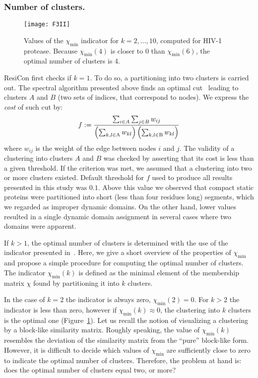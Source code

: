 \documentclass[a4paper,11pt,twoside]{book}%
\begin{document}
\subsubsection*{Number of clusters.}
\begin{figure}
\centering
\texttt{[image: F3II]}
\caption{
Values of the $\chi_{\text{min}}$ indicator for $k=2,\ldots,10$, computed for HIV-1 protease.
Because $\chi_{\text{min}}(4)$ is closer to 0 than $\chi_{\text{min}}(6)$, the optimal number of clusters is 4.
}
\label{minChiList}
\end{figure}
ResiCon first checks if $k=1$.
To do so, a partitioning into two clusters is carried out.
The spectral algorithm presented above finds an optimal cut~\cite{weber2004perron} leading to clusters $A$ and $B$ (two sets of indices, that correspond to nodes).
We express the \emph{cost} of such cut by:
\begin{displaymath}
f :=  \frac{\sum_{i \in A}\sum_{j \in B} w_{ij}}{\left ( \sum_{k,l \in \text{A}} w_{kl} \right ) \left ( \sum_{k,l \in \text{B}} w_{kl}   \right )} \\
\end{displaymath}
where $w_{ij}$ is the weight of the edge between nodes $i$ and $j$.
The validity of a clustering into clusters $A$ and $B$ was checked by asserting that its cost is less than a given threshold.
If the criterion was met, we assumed that a clustering into two or more clusters existed.
Default threshold for $f$ used to produce all results presented in this study was $0.1$. 
Above this value we observed that compact static proteins were partitioned into short (less than four residues long) segments, which we regarded as improper dynamic domains.
On the other hand, lower values resulted in a single dynamic domain assignment in several cases where two domains were apparent.

If $k>1$, the optimal number of clusters is determined with the use of the indicator presented in~\cite{weber2004perron}.
Here, we give a short overview of the properties of $\chi_{\text{min}}$ and propose a simple procedure for computing the optimal number of clusters.
The indicator $\chi_{\text{min}}(k)$ is defined as the minimal element of the membership matrix $\chi$ found by partitioning it into $k$ clusters.

In the case of $k=2$ the indicator is always zero, $\chi_\text{min}(2)=0$.
For $k>2$ the indicator is less than zero, however if $\chi_\text{min}(k)\approx 0$, the clustering into $k$ clusters is the optimal one (Figure~\ref{minChiList}).
Let us recall the notion of visualizing a clustering by a block-like similarity matrix.
Roughly speaking, the value of $\chi_\text{min}(k)$ resembles the deviation of the similarity matrix from the ``pure'' block-like form.
However, it is difficult to decide which values of $\chi_\text{min}$ are sufficiently close to zero to indicate the optimal number of clusters.
Therefore, the problem at hand is: does the optimal number of clusters equal two, or more?
\end{document}
